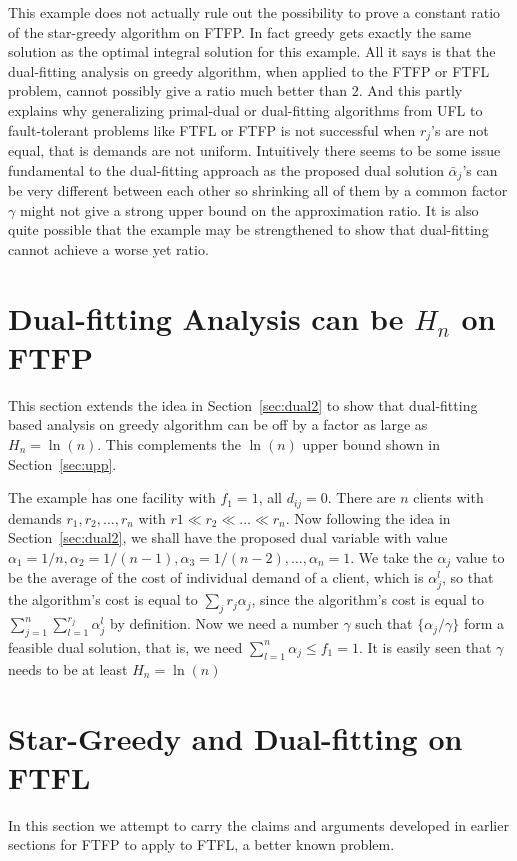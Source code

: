 \documentclass{article}
\begin{document}
This example does not actually rule out the possibility to prove a
constant ratio of the star-greedy algorithm on FTFP. In fact greedy
gets exactly the same solution as the optimal integral solution for
this example. All it says is that the dual-fitting analysis on greedy
algorithm, when applied to the FTFP or FTFL problem, cannot possibly
give a ratio much better than $2$. And this partly explains why
generalizing primal-dual or dual-fitting algorithms from UFL to
fault-tolerant problems like FTFL or FTFP is not successful when
$r_j$'s are not equal, that is demands are not uniform. Intuitively
there seems to be some issue fundamental to the dual-fitting approach
as the proposed dual solution $\bar\alpha_j$'s can be very different
between each other so shrinking all of them by a common factor
$\gamma$ might not give a strong upper bound on the approximation
ratio. It is also quite possible that the example may be strengthened
to show that dual-fitting cannot achieve a worse yet ratio.

\section{Dual-fitting Analysis can be $H_n$ on FTFP}
This section extends the idea in Section~\ref{sec:dual2} to show that
dual-fitting based analysis on greedy algorithm can be off by a factor
as large as $H_n = \ln(n)$. This complements the $\ln(n)$ upper bound
shown in Section~\ref{sec:upp}.

The example has one facility with $f_1 = 1$, all $d_{ij}=0$. There are
$n$ clients with demands $r_1, r_2, \ldots, r_n$ with $r1 \ll r_2 \ll
\ldots \ll r_n$. Now following the idea in Section~\ref{sec:dual2}, we
shall have the proposed dual variable with value $\alpha_1=1/n,
\alpha_2 = 1/(n-1), \alpha_3 = 1/(n-2), \ldots, \alpha_n = 1$. We take
the $\alpha_j$ value to be the average of the cost of individual
demand of a client, which is $\alpha_j^l$, so that the algorithm's
cost is equal to $\sum_{j} r_j\alpha_j$, since the algorithm's cost is
equal to $\sum_{j=1}^n \sum_{l=1}^{r_j} \alpha_j^l$ by definition. Now
we need a number $\gamma$ such that $\{\alpha_j/\gamma\}$ form a
feasible dual solution, that is, we need $\sum_{l=1}^n \alpha_j \leq
f_1 = 1$. It is easily seen that $\gamma$ needs to be at least $H_n =
\ln(n)$

\section{Star-Greedy and Dual-fitting on FTFL}
In this section we attempt to carry the claims and arguments developed
in earlier sections for FTFP to apply to FTFL, a better known
problem.
\end{document}
